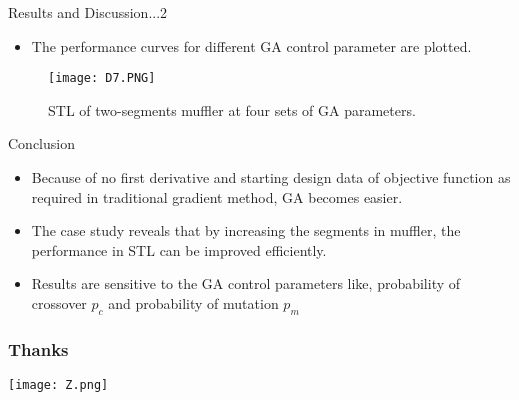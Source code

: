 \documentclass{beamer}
\begin{document}
\begin{frame}{Results and Discussion...2}
\begin{itemize}
\item The performance curves for different GA control parameter are plotted.
\end{itemize}
\begin{figure}
\texttt{[image: D7.PNG]}
\caption{\label{fig:your-figure14} STL of two-segments muffler at four sets of GA parameters.}
\end{figure}
\end{frame}
\begin{frame}{Conclusion}
\begin{itemize}
\item Because of no first derivative and starting design data of objective function as required in traditional gradient method, GA becomes easier.
\item The case study reveals that by increasing the segments in muffler, the performance in STL can be improved efficiently.
\item Results are sensitive to the GA control parameters like, probability of crossover $p_{c}$ and probability of mutation $p_{m}$
\end{itemize}
\end{frame}
\begin{frame}
\frametitle{Thanks}
\begin{center}
\texttt{[image: Z.png]}

\end{center}
\end{frame}

\end{document}

